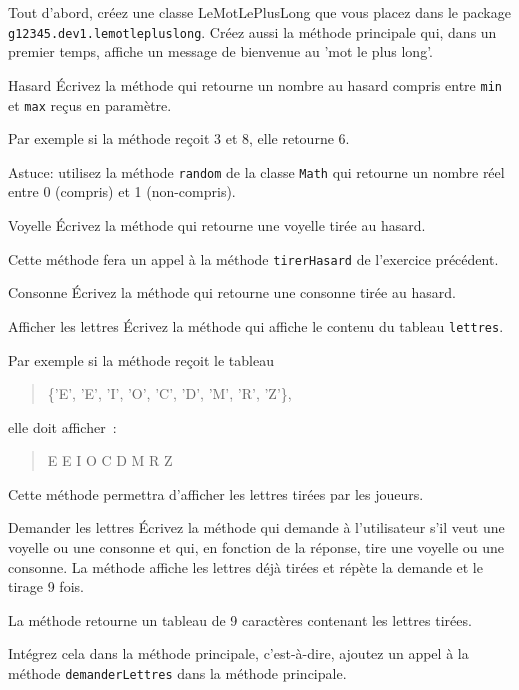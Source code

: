 \documentclass[a4paper,11pt]{style-esi/td}
\begin{document}
	Tout d'abord,
	créez une classe \mbox{LeMotLePlusLong} que vous placez dans le package \texttt{g12345.dev1.lemotlepluslong}.
	Créez aussi la méthode principale qui, dans un premier temps, 
	affiche un message de bienvenue au 'mot le plus long'.

 	\begin{Exercice}{Hasard}
		\'Ecrivez la méthode  qui
		retourne un nombre au hasard compris entre \texttt{min} et
		\texttt{max} reçus en paramètre.
		
		Par exemple si la méthode reçoit 3 et 8, elle retourne 6.
		
		Astuce: utilisez la méthode \texttt{random} de la classe \texttt{Math} qui 
		retourne un nombre réel entre 0 (compris) et 1 (non-compris).
	\end{Exercice} 

 
 	\begin{Exercice}{Voyelle}
		\'Ecrivez la méthode  qui retourne une voyelle 
		tirée au hasard.
		
		Cette méthode fera un appel à la méthode \texttt{tirerHasard} 
		de l'exercice précédent.
	\end{Exercice} 

 	\begin{Exercice}{Consonne}
		\'Ecrivez la méthode  qui retourne une consonne 
		tirée au hasard.
	\end{Exercice} 

 	\begin{Exercice}{Afficher les lettres}
 		\'Ecrivez la méthode 
		qui affiche le contenu du tableau \texttt{lettres}.
		
		Par exemple si la méthode reçoit le tableau 
                \begin{quote}\ttfamily
		\{'E', 'E', 'I', 'O', 'C', 'D', 'M', 'R', 'Z'\},
              \end{quote}
		elle doit afficher~:
		\begin{quote}\ttfamily
		E E I O C D M R Z
		\end{quote}
		
		Cette méthode permettra d'afficher les lettres tirées par les joueurs.
	\end{Exercice} 

 	\begin{Exercice}{Demander les lettres}
		\'Ecrivez la méthode 
		qui demande à l'utilisateur s'il veut une voyelle ou une consonne
		et qui, en fonction de la réponse, tire une voyelle ou une consonne.
		La méthode affiche les lettres déjà tirées et répète la demande
		et le tirage 9 fois.
		 
		La méthode retourne un tableau de 9 caractères contenant les lettres tirées. 
		
		Intégrez cela dans la méthode principale, c'est-à-dire, ajoutez un appel à 
		la méthode \texttt{demanderLettres} dans la méthode principale.
	\end{Exercice} 
\end{document}
